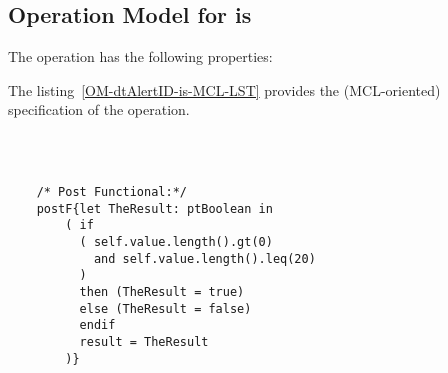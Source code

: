 \subsection{Operation Model for is}

\label{OM-is}


The  operation has the following properties:

	\begin{operationmodel}



		


	\end{operationmodel}



	\vspace{1cm}
	The listing~\ref{OM-dtAlertID-is-MCL-LST} provides the \msrmessir (MCL-oriented) specification of the operation.
	
	\scriptsize
	\vspace{0.5cm}
	\begin{lstlisting}[style=MessirStyle,firstnumber=auto,captionpos=b,caption={\msrmessir (MCL-oriented) specification of the operation \emph{is}.},label=OM-dtAlertID-is-MCL-LST]

	
	
	/* Post Functional:*/ 
	postF{let TheResult: ptBoolean in
	    ( if
	      ( self.value.length().gt(0)
	        and self.value.length().leq(20)
	      )
	      then (TheResult = true)
	      else (TheResult = false)
	      endif
	      result = TheResult
	    )}
	
	
	\end{lstlisting}
	\normalsize 
	
	
	
	





